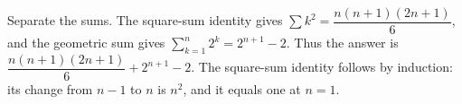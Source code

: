 Separate the sums. The square-sum identity gives $\sum k^2=\dfrac{n(n+1)(2n+1)}{6}$, and the geometric sum gives $\sum_{k=1}^n2^k=2^{n+1}-2$. Thus the answer is $\boxed{\dfrac{n(n+1)(2n+1)}{6}+2^{n+1}-2}$. The square-sum identity follows by induction: its change from $n-1$ to $n$ is $n^2$, and it equals one at $n=1$.
